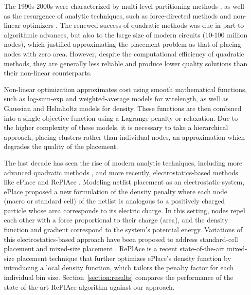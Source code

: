 \documentclass{article}
\begin{document}
The 1990s-2000s were characterized by multi-level partitioning methods \cite{fengshui2005,capo2007}, as well as the resurgence of analytic techniques, such as force-directed methods \cite{dplace2008,mfar2005,kraftwerk2005,kraftwerk22008,fastplace2007,rql2007} and non-linear optimizers \cite{aplace22005,NTUPlacer06}. The renewed success of quadratic methods was due in part to algorithmic advances, but also to the large size of modern circuits (10-100 million nodes), which justified approximating the placement problem as that of placing nodes with zero area. However, despite the computational efficiency of quadratic methods, they are generally less reliable and produce lower quality solutions than their non-linear counterparts.

Non-linear optimization approximates cost using smooth mathematical functions, such as log-sum-exp \cite{logsumexp2001} and weighted-average \cite{weightedaverage2011} models for wirelength, as well as Gaussian \cite{ntuplace32008} and Helmholtz models for density. These functions are then combined into a single objective function using a Lagrange penalty or relaxation. Due to the higher complexity of these models, it is necessary to take a hierarchical approach, placing clusters rather than individual nodes, an approximation which degrades the quality of the placement.


The last decade has seen the rise of modern analytic techniques, including more advanced quadratic methods \cite{simpl2010,maple2012,complx2012,bonnplace2008,polar2013}, and more recently, electrostatics-based methods like ePlace \cite{EPlace15} and RePlAce \cite{RePlAce19}. Modeling netlist placement as an electrostatic system, ePlace \cite{EPlace15} proposed a new formulation of the density penalty where each node (macro or standard cell) of the netlist is analogous to a positively charged particle whose area corresponds to its electric charge. In this setting, nodes repel each other with a force proportional to their charge (area), and the density function and gradient correspond to the system's potential energy. Variations of this electrostatics-based approach have been proposed to address standard-cell placement \cite{EPlace15} and mixed-size placement \cite{EPlacemixed15,EPLace3D16}. RePlAce \cite{RePlAce19} is a recent state-of-the-art mixed-size placement technique that further optimizes ePlace's density function by introducing a local density function, which tailors the penalty factor for each individual bin size. Section~\ref{section:results} compares the performance of the state-of-the-art RePlAce algorithm against our approach. 
\end{document}
